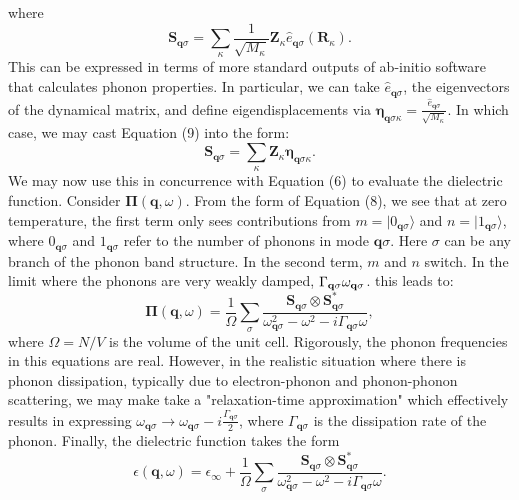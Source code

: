 \documentclass[superscriptaddress,reprint,prb]{revtex4-1}
\begin{document}
where 
\begin{equation}
\mathbf{S}_{\mathbf{q}\sigma} = \sum\limits_{\kappa} \frac{1}{\sqrt{M_{\kappa}}}\mathbf{Z}_{\kappa}\hat{e}_{\mathbf{q}\sigma}(\mathbf{R}_{\kappa}).
\end{equation}
This can be expressed in terms of more standard outputs of ab-initio software that calculates phonon properties. In particular, we can take $\hat{e}_{\mathbf{q}\sigma}$, the eigenvectors of the dynamical matrix, and define eigendisplacements via $\boldsymbol{\eta}_{\mathbf{q}\sigma\kappa}=\frac{\hat{e}_{\mathbf{q}\sigma}}{\sqrt{M_{\kappa}}}$. In which case, we may cast Equation (9) into the form:
\begin{equation}
\mathbf{S}_{\mathbf{q}\sigma} = \sum\limits_{\kappa} \mathbf{Z}_{\kappa}\boldsymbol{\eta}_{\mathbf{q}\sigma\kappa}.
\end{equation}
We may now use this in concurrence with Equation (6) to evaluate the dielectric function. Consider $\boldsymbol{\Pi}(\mathbf{q},\omega)$. From the form of Equation (8), we see that at zero temperature, the first term only sees contributions from $m=|0_{\mathbf{q}\sigma}\rangle$ and $n=|1_{\mathbf{q}\sigma}\rangle$, where $0_{\mathbf{q}\sigma}$ and $1_{\mathbf{q}\sigma}$ refer to the number of phonons in mode $\mathbf{q}\sigma$. Here $\sigma$ can be any branch of the phonon band structure. In the second term, $m$ and $n$ switch. In the limit where the phonons are very weakly damped, $\Gamma_{\mathbf{q}\sigma} \\ \omega_{\mathbf{q}\sigma}$. this leads to:
\begin{equation}
\boldsymbol{\Pi}(\mathbf{q},\omega) = \frac{1}{\Omega}\sum\limits_{\sigma}\frac{\mathbf{S}_{\mathbf{q}\sigma}\otimes \mathbf{S}_{\mathbf{q}\sigma}^*}{\omega^2_{\mathbf{q}\sigma}-\omega^2-i\Gamma_{\mathbf{q}\sigma}\omega},
\end{equation}
where $\Omega=N/V$ is the volume of the unit cell. Rigorously, the phonon frequencies in this equations are real. However, in the realistic situation where there is phonon dissipation, typically due to electron-phonon and phonon-phonon scattering, we may make take a "relaxation-time approximation" which effectively results in expressing $\omega_{\mathbf{q}\sigma} \rightarrow \omega_{\mathbf{q}\sigma} - i\frac{\Gamma_{\mathbf{q}\sigma}}{2}$, where $\Gamma_{\mathbf{q}\sigma}$ is the dissipation rate of the phonon. Finally, the dielectric function takes the form
\begin{equation}
\epsilon(\mathbf{q},\omega) = \epsilon_{\infty} + \frac{1}{\Omega}\sum\limits_{\sigma}\frac{\mathbf{S}_{\mathbf{q}\sigma}\otimes \mathbf{S}_{\mathbf{q}\sigma}^*}{\omega^2_{\mathbf{q}\sigma}-\omega^2-i\Gamma_{\mathbf{q}\sigma}\omega}.
\end{equation}
\end{document}
